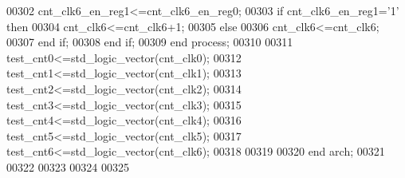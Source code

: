 \begin{DoxyCode}
00302             \textcolor{vhdlchar}{cnt_clk6_en_reg1}\textcolor{vhdlchar}{<=}\textcolor{vhdlchar}{cnt_clk6_en_reg0};
00303           \textcolor{keywordflow}{if} \textcolor{vhdlchar}{cnt_clk6_en_reg1}\textcolor{vhdlchar}{=}\textcolor{vhdlchar}{'}\textcolor{vhdllogic}{}\textcolor{vhdllogic}{1}\textcolor{vhdlchar}{'} \textcolor{keywordflow}{then} 
00304                 \textcolor{vhdlchar}{cnt_clk6}\textcolor{vhdlchar}{<=}\textcolor{vhdlchar}{cnt_clk6}\textcolor{vhdlchar}{+}\textcolor{vhdllogic}{}\textcolor{vhdllogic}{1};
00305             \textcolor{keywordflow}{else} 
00306                 \textcolor{vhdlchar}{cnt_clk6}\textcolor{vhdlchar}{<=}\textcolor{vhdlchar}{cnt_clk6};
00307             \textcolor{keywordflow}{end} \textcolor{keywordflow}{if};
00308         \textcolor{keywordflow}{end} \textcolor{keywordflow}{if};
00309     \textcolor{keywordflow}{end} \textcolor{keywordflow}{process};    
00310 
00311 \textcolor{vhdlchar}{test_cnt0}\textcolor{vhdlchar}{<=}\textcolor{comment}{std\_logic\_vector}\textcolor{vhdlchar}{(}\textcolor{vhdlchar}{cnt_clk0}\textcolor{vhdlchar}{)};
00312 \textcolor{vhdlchar}{test_cnt1}\textcolor{vhdlchar}{<=}\textcolor{comment}{std\_logic\_vector}\textcolor{vhdlchar}{(}\textcolor{vhdlchar}{cnt_clk1}\textcolor{vhdlchar}{)};
00313 \textcolor{vhdlchar}{test_cnt2}\textcolor{vhdlchar}{<=}\textcolor{comment}{std\_logic\_vector}\textcolor{vhdlchar}{(}\textcolor{vhdlchar}{cnt_clk2}\textcolor{vhdlchar}{)};
00314 \textcolor{vhdlchar}{test_cnt3}\textcolor{vhdlchar}{<=}\textcolor{comment}{std\_logic\_vector}\textcolor{vhdlchar}{(}\textcolor{vhdlchar}{cnt_clk3}\textcolor{vhdlchar}{)};
00315 \textcolor{vhdlchar}{test_cnt4}\textcolor{vhdlchar}{<=}\textcolor{comment}{std\_logic\_vector}\textcolor{vhdlchar}{(}\textcolor{vhdlchar}{cnt_clk4}\textcolor{vhdlchar}{)};
00316 \textcolor{vhdlchar}{test_cnt5}\textcolor{vhdlchar}{<=}\textcolor{comment}{std\_logic\_vector}\textcolor{vhdlchar}{(}\textcolor{vhdlchar}{cnt_clk5}\textcolor{vhdlchar}{)};
00317 \textcolor{vhdlchar}{test_cnt6}\textcolor{vhdlchar}{<=}\textcolor{comment}{std\_logic\_vector}\textcolor{vhdlchar}{(}\textcolor{vhdlchar}{cnt_clk6}\textcolor{vhdlchar}{)};
00318 
00319      
00320 \textcolor{keywordflow}{end} \textcolor{vhdlchar}{arch};
00321 
00322 
00323 
00324 
00325 
\end{DoxyCode}
